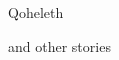 \thispagestyle{empty}
\null
\vfill
\begin{flushright}
  \DisplayFont Qoheleth

  \vspace{1ex}

  {\footnotesize and other stories}
\end{flushright}
\vfill
\cleardoublepage
